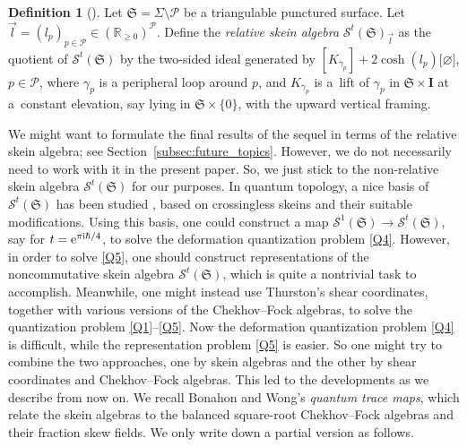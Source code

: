 \documentclass[10pt,a4paper]{amsart}
\numberwithin{equation}{section}
\theoremstyle{definition}
\newtheorem{Definition}[Theorem]{Definition}
\begin{document}
\begin{Definition}[\cite{AS, FKL}]
\label{def:relative_skein_algebra}
Let $\mathfrak{S} = \Sigma \setminus \mathcal{P}$ be a triangulable punctured surface. Let $\vec{l} = (l_p)_{p \in \mathcal{P}} \in (\mathbb{R}_{\ge 0})^\mathcal{P}$.
Define the {\em relative skein algebra} $\mathcal{S}^t(\mathfrak{S})_{\vec{l}}$ as the quotient of $\mathcal{S}^t(\mathfrak{S})$ by the two-sided ideal generated by $[K_{\gamma_p}] + 2\cosh(l_p) [{\varnothing]}$, $p\in \mathcal{P}$, where $\gamma_p$ is a peripheral loop around $p$, and $K_{\gamma_p}$ is a~lift of $\gamma_p$ in $\mathfrak{S} \times \mathbf{I}$ at a~constant elevation, say lying in $\mathfrak{S} \times \{0\}$, with the upward vertical framing.
\end{Definition}
We might want to formulate the final results of the sequel \cite{sequel} in terms of the relative skein algebra; see Section~\ref{subsec:future_topics}. However, we do not necessarily need to work with it in the present paper. So, we just stick to the non-relative skein algebra $\mathcal{S}^t(\mathfrak{S})$ for our purposes.
In quantum topology, a nice basis of $\mathcal{S}^t(\mathfrak{S})$ has been studied \cite{AK, DThurston}, based on crossingless skeins and their suitable modifications. Using this basis, one could construct a map $\mathcal{S}^1(\mathfrak{S}) \to \mathcal{S}^t(\mathfrak{S})$, say for $t = {\rm e}^{\pi {\rm i} \hbar/4}$, to solve the deformation quantization problem \ref{Q4}. However, in order to solve \ref{Q5}, one should construct representations of the noncommutative skein algebra $\mathcal{S}^t(\mathfrak{S})$, which is quite a nontrivial task to accomplish. Meanwhile, one might instead use Thurston's shear coordinates, together with various versions of the Chekhov--Fock algebras, to solve the quantization problem \ref{Q1}--\ref{Q5}. Now the deformation quantization problem \ref{Q4} is difficult, while the representation problem \ref{Q5} is easier. So one might try to combine the two approaches, one by skein algebras and the other by shear coordinates and Chekhov--Fock algebras. This led to the developments as we describe from now on.
We recall Bonahon and Wong's {\em quantum trace maps}, which relate the skein algebras to the balanced square-root Chekhov--Fock algebras and their fraction skew fields. We only write down a partial version as follows.
\end{document}
